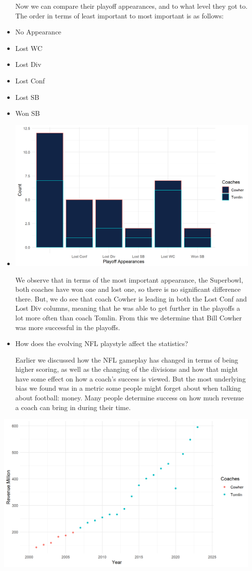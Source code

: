 \documentclass[
  letterpaper,
  DIV=11,
  numbers=noendperiod]{scrartcl}
\begin{document}
\begin{itemize}
  Now we can compare their playoff appearances, and to what level they
  got to. The order in terms of least important to most important is as
  follows:
\item
  No Appearance
\item
  Lost WC
\item
  Lost Div
\item
  Lost Conf
\item
  Lost SB
\item
  Won SB
\item
  \includegraphics{images/clipboard-172469514.png}

  We observe that in terms of the most important appearance, the
  Superbowl, both coaches have won one and lost one, so there is no
  significant difference there. But, we do see that coach Cowher is
  leading in both the Lost Conf and Lost Div columns, meaning that he
  was able to get further in the playoffs a lot more often than coach
  Tomlin. From this we determine that Bill Cowher was more successful in
  the playoffs.
\item
  How does the evolving NFL playstyle affect the statistics?

  Earlier we discussed how the NFL gameplay has changed in terms of
  being higher scoring, as well as the changing of the divisions and how
  that might have some effect on how a coach's success is viewed. But
  the most underlying bias we found was in a metric some people might
  forget about when talking about football: money. Many people determine
  success on how much revenue a coach can bring in during their time.
\end{itemize}

\includegraphics{images/clipboard-244220973.png}
\end{document}
